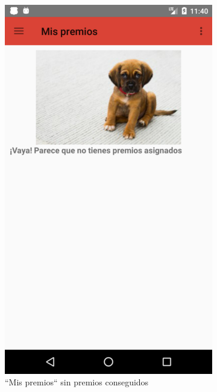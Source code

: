 \documentclass[twoside]{report}
\begin{document}
\begin{figure}[H]
\begin{center}
	\begin{subfigure}[t]{.3\linewidth}
		\includegraphics[scale=0.2]{images/userguide/9.png}
		\caption{“Mis premios“ sin premios conseguidos}
	\end{subfigure}\hspace{5mm}%
	\begin{subfigure}[t]{.3\linewidth}

\end{subfigure}
\end{center}
\end{figure}
\end{document}
